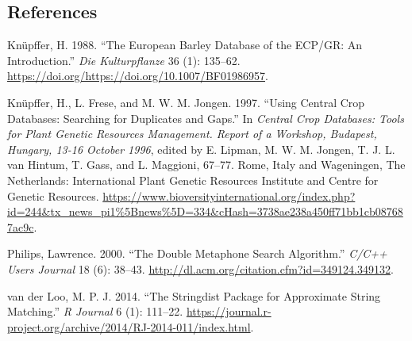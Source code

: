 \documentclass[
]{article}
\begin{document}
\hypertarget{references}{%
\subsection*{References}\label{references}}

\hypertarget{refs}{}
\leavevmode\hypertarget{ref-knupffer1988european}{}%
Knüpffer, H. 1988. ``The European Barley Database of the ECP/GR: An
Introduction.'' \emph{Die Kulturpflanze} 36 (1): 135--62.
\url{https://doi.org/https://doi.org/10.1007/BF01986957}.

\leavevmode\hypertarget{ref-kfj97}{}%
Knüpffer, H., L. Frese, and M. W. M. Jongen. 1997. ``Using Central Crop
Databases: Searching for Duplicates and Gaps.'' In \emph{Central Crop
Databases: Tools for Plant Genetic Resources Management. Report of a
Workshop, Budapest, Hungary, 13-16 October 1996}, edited by E. Lipman,
M. W. M. Jongen, T. J. L. van Hintum, T. Gass, and L. Maggioni, 67--77.
Rome, Italy and Wageningen, The Netherlands: International Plant Genetic
Resources Institute and Centre for Genetic Resources.
\url{https://www.bioversityinternational.org/index.php?id=244\&tx_news_pi1\%5Bnews\%5D=334\&cHash=3738ae238a450ff71bb1cb087687ac9c}.

\leavevmode\hypertarget{ref-p00}{}%
Philips, Lawrence. 2000. ``The Double Metaphone Search Algorithm.''
\emph{C/C++ Users Journal} 18 (6): 38--43.
\url{http://dl.acm.org/citation.cfm?id=349124.349132}.

\leavevmode\hypertarget{ref-van2014stringdist}{}%
van der Loo, M. P. J. 2014. ``The Stringdist Package for Approximate
String Matching.'' \emph{R Journal} 6 (1): 111--22.
\url{https://journal.r-project.org/archive/2014/RJ-2014-011/index.html}.
\end{document}
